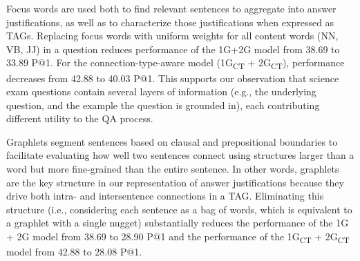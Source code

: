 {%
{} Focus words are used both to find relevant sentences to aggregate into answer justifications, as well as to characterize those justifications when expressed as TAGs. Replacing focus words with uniform weights for all content words (NN, VB, JJ) in a question reduces performance of the 1G+2G model from 38.69 to 33.89 P@1.  For the connection-type-aware model (1G\textsubscript{CT} + 2G\textsubscript{CT}), performance decreases from 42.88 to 40.03 P@1. This supports our observation that science exam questions contain several layers of information (e.g., the underlying question, and the example the question is grounded in), each contributing different utility to the QA process. 

{}  Graphlets segment sentences based on clausal and prepositional boundaries to facilitate evaluating how well two sentences connect using structures larger than a word but more fine-grained than the entire sentence.  
In other words, graphlets are the key structure in our representation of answer justifications because they drive both intra- and intersentence connections in a TAG. 
Eliminating this structure (i.e., considering each sentence as a bag of words, which is equivalent to a graphlet with a single nugget)
substantially reduces the performance of the 1G + 2G model from 38.69 to 28.90 P@1 and the performance of the 1G\textsubscript{CT} + 2G\textsubscript{CT} model from 42.88 to 28.08 P@1. 

}
